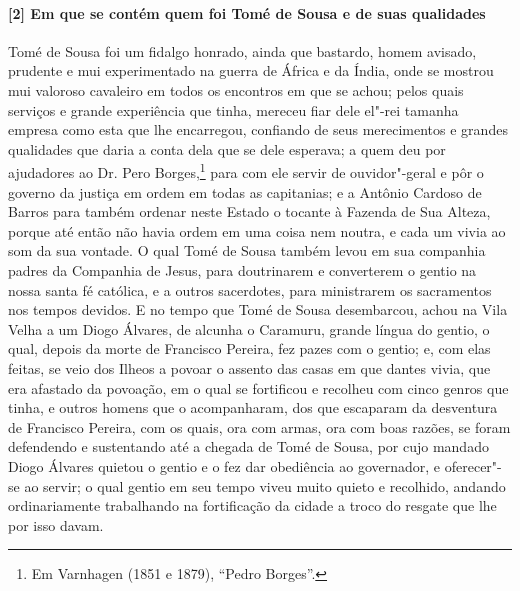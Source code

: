 \paragraph{[2] Em que se contém quem foi Tomé de Sousa e de suas qualidades} \quad
Tomé de Sousa foi um fidalgo honrado, ainda que bastardo, homem avisado, prudente e mui
experimentado na guerra de África e da Índia, onde se mostrou mui valoroso cavaleiro em
todos os encontros em que se achou; pelos quais serviços e grande experiência que tinha,
mereceu fiar dele el"-rei tamanha empresa como esta que lhe encarregou, confiando de seus
merecimentos e grandes qualidades que daria a conta dela que se dele esperava; a quem deu
por ajudadores ao Dr. Pero Borges,\footnote{ Em Varnhagen (1851 e 1879), ``Pedro
Borges''.} para com ele servir de ouvidor"-geral e pôr o governo da justiça em ordem em
todas as capitanias; e a Antônio Cardoso de Barros para também ordenar neste Estado o
tocante à Fazenda de Sua Alteza, porque até então não havia ordem em uma coisa nem noutra,
e cada um vivia ao som da sua vontade. O qual Tomé de Sousa também levou em sua companhia
padres da Companhia de Jesus, para doutrinarem e converterem o gentio na nossa santa fé
católica, e a outros sacerdotes, para ministrarem os sacramentos nos tempos devidos. E no
tempo que Tomé de Sousa desembarcou, achou na Vila Velha a um Diogo Álvares, de alcunha o
Caramuru, grande língua do gentio, o qual, depois da morte de Francisco Pereira, fez pazes
com o gentio; e, com elas feitas, se veio dos Ilheos a povoar o assento das casas em que
dantes vivia, que era afastado da povoação, em o qual se fortificou e recolheu com cinco
genros que tinha, e outros homens que o acompanharam, dos que escaparam da desventura de
Francisco Pereira, com os quais, ora com armas, ora com boas razões, se foram defendendo e
sustentando até a chegada de Tomé de Sousa, por cujo mandado Diogo Álvares quietou o
gentio e o fez dar obediência ao governador, e oferecer"-se ao servir; o qual gentio em seu
tempo viveu muito quieto e recolhido, andando ordinariamente trabalhando na fortificação
da cidade a troco do resgate que lhe por isso davam.

